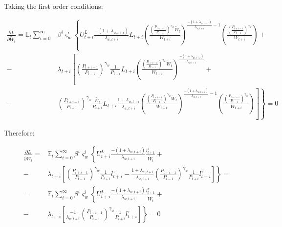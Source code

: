 \documentclass{pracamgr}
\numberwithin{equation}{section}
\begin{document}
Taking the first order conditions:

\begin{align}
\frac{\partial L}{\partial \widetilde{W}_{t}}  =  \mathbb{E}_{t} \sum\limits_{i=0}^{\infty} &\beta^{i} \varsigma_{w}^{i}  \left\{ U_{t+i}^{L} {\frac{-(1+\lambda_{w,t+i})}{\lambda_{w,t+i}}} L_{t+i} \left( \frac{\left( \frac{P_{t+i-1}}{P_{t-1}} \right)^{\gamma_{w}} \widetilde{W}_{t}}{W_{t+i}}\right)^{\frac{-(1+\lambda_{w,t+i})}{\lambda_{w,t+i}}-1} \left( \frac{\left( \frac{P_{t+i-1}}{P_{t-1}} \right)^{\gamma_{w}}}{W_{t+i}}\right)  \right. + \nonumber \\ 
-  &\lambda_{t+i} \left[ \left( \frac{P_{t+i-1}}{P_{t-1}} \right)^{\gamma_{w}} \frac{1}{P_{t+i}} L_{t+i} \left( \frac{\left( \frac{P_{t+i-1}}{P_{t-1}} \right)^{\gamma_{w}} \widetilde{W}_{t}}{W_{t+i}}\right)^{\frac{-(1+\lambda_{w,t+i})}{\lambda_{w,t+i}}} \right. + \nonumber \\ 
-  &\left. \left. \left( \frac{P_{t+i-1}}{P_{t-1}} \right)^{\gamma_{w}} \frac{\widetilde{W_{t}}}{P_{t+i}} L_{t+i} {\frac{1+\lambda_{w,t+i}}{\lambda_{w,t+i}}} \left( \frac{\left( \frac{P_{t+i-1}}{P_{t-1}} \right)^{\gamma_{w}} \widetilde{W}_{t}}{W_{t+i}}\right)^{\frac{-(1+\lambda_{w,t+i})}{\lambda_{w,t+i}}-1} \left( \frac{\left( \frac{P_{t+i-1}}{P_{t-1}} \right)^{\gamma_{w}}}{W_{t+i}}\right) \right] \right\} = 0
\end{align}

Therefore:

\begin{align}
\frac{\partial L}{\partial \widetilde{W}_{t}} = &\mathbb{E}_{t} \sum\limits_{i=0}^{\infty} \beta^{i} \varsigma_{w}^{i}  \left\{ U_{t+i}^{L} {\frac{-(1+\lambda_{w,t+i})}{\lambda_{w,t+i}}} \frac{l_{t+1}^{\tau}}{\widetilde{W}_{t}}  \right. + \nonumber \\ 
- &\lambda_{t+i} \left. \left[ \left( \frac{P_{t+i-1}}{P_{t-1}} \right)^{\gamma_{w}} \frac{1}{P_{t+i}} l_{t+i}^{\tau} - {\frac{1+\lambda_{w,t+i}}{\lambda_{w,t+i}}} \left( \frac{P_{t+i-1}}{P_{t-1}} \right)^{\gamma_{w}} \frac{1}{P_{t+i}} l_{t+i}^{\tau} \right] \right\} = \nonumber \\ 
= &\mathbb{E}_{t} \sum\limits_{i=0}^{\infty} \beta^{i} \varsigma_{w}^{i}  \left\{ U_{t+i}^{L} {\frac{-(1+\lambda_{w,t+i})}{\lambda_{w,t+i}}} \frac{l_{t+1}^{\tau}}{\widetilde{W}_{t}}  \right. + \nonumber \\ 
- &\lambda_{t+i} \left. \left[ {\frac{-1}{\lambda_{w,t+i}}} \left( \frac{P_{t+i-1}}{P_{t-1}} \right)^{\gamma_{w}} \frac{1}{P_{t+i}} l_{t+i}^{\tau} \right] \right\} = 0
\end{align}
\end{document}
